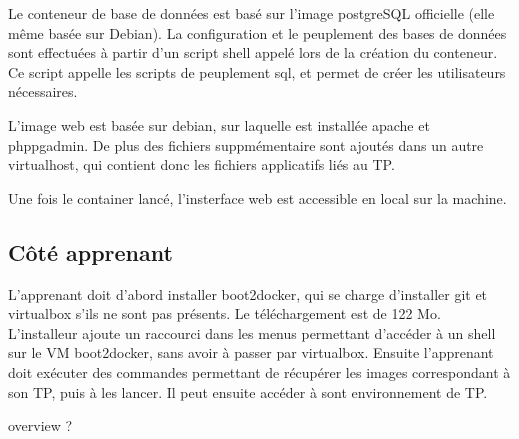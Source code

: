 \documentclass[a4paper,11pt]{report}
\begin{document}
Le conteneur de base de données est basé sur l'image postgreSQL officielle (elle même basée
sur Debian). La configuration et le peuplement des bases de données sont effectuées à partir d'un script shell appelé lors de la création du conteneur. Ce script appelle les scripts de peuplement sql, et permet de créer les utilisateurs nécessaires.

L'image web est basée sur debian, sur laquelle est installée apache et phppgadmin. De plus des fichiers suppmémentaire sont ajoutés dans un autre virtualhost, qui contient donc les fichiers applicatifs liés au TP.

Une fois le container lancé, l'insterface web est accessible en local sur la machine.

\subsection{Côté apprenant}

L'apprenant doit d'abord installer boot2docker, qui se charge d'installer git et virtualbox s'ils ne sont pas présents. Le téléchargement est de 122 Mo. L'installeur ajoute un raccourci dans les menus permettant d'accéder à un shell sur le VM boot2docker, sans avoir à passer par virtualbox. Ensuite l'apprenant doit exécuter des commandes permettant de récupérer les images correspondant à son TP, puis à les lancer. Il peut ensuite accéder à sont environnement de TP.


overview ?


\printbibliography
\end{document}
